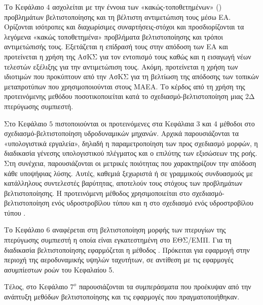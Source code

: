 Το Κεφάλαιο $4$ ασχολείται με την έννοια των «κακώς-τοποθετημένων» () προβλημάτων βελτιστοποίησης και τη βέλτιστη αντιμετώπιση τους μέσω ΕΑ.
\newline
Ορίζονται ισότροπες και διαχωρίσιμες συναρτήσεις-στόχοι και προσδιορίζονται τα λεγόμενα «κακώς τοποθετημένα» προβλήματα βελτιστοποίησης και τρόποι αντιμετώπισής τους.  Εξετάζεται η επίδρασή τους στην απόδοση των ΕΑ και προτείνεται η χρήση της ΑσΚΣ για τον εντοπισμό τους καθώς και η εισαγωγή νέων τελεστών εξέλιξης για την αντιμετώπιση τους.  Ακόμη, προτείνεται η χρήση των ιδιοτιμών που προκύπτουν από την ΑσΚΣ για τη βελτίωση της απόδοσης των τοπικών μεταπροτύπων που χρησιμοποιούνται στους ΜΑΕΑ. Το κέρδος από τη χρήση της προτεινόμενης μεθόδου ποσοτικοποιείται κατά το σχεδιασμό-βελτιστοποίηση μιας 2Δ πτερύγωσης συμπιεστή.  

Στο Κεφάλαιο $5$ πιστοποιούνται οι προτεινόμενες στα Κεφάλαια 3 και 4 μέθοδοι στο σχεδιασμό-βελτιστοποίηση υδροδυναμικών μηχανών.  Αρχικά παρουσιάζονται τα «υπολογιστικά εργαλεία»,  δηλαδή η παραμετροποίηση των προς σχεδιασμό μορφών, η διαδικασία γένεσης υπολογιστικού πλέγματος και ο επιλύτης των εξισώσεων της ροής.  Στη συνέχεια, παρουσιάζονται οι μετρικές ποιότητας που χαρακτηρίζουν την απόδοση κάθε υποψήφιας λύσης. Αυτές, καθεμιά ξεχωριστά ή σε γραμμικούς συνδυασμούς με κατάλληλους συντελεστές βαρύτητας, αποτελούν τους στόχους των προβλημάτων βελτιστοποίησης.    Η προτεινόμενη μέθοδος  χρησιμοποιείται στο σχεδιασμό-βελτιστοποίηση ενός υδροστροβίλου τύπου  και η  στο σχεδιασμό ενός υδροστροβίλου τύπου .   


Το Κεφάλαιο $6$ αναφέρεται στη βελτιστοποίηση μορφής των πτερυγίων της πτερύγωσης συμπιεστή η οποία είναι εγκατεστημένη στο ΕΘΣ/ΕΜΠ. Για τη διαδικασία βελτιστοποίησης εφαρμόζεται η μέθοδος . Πρόκειται για εφαρμογή στην περιοχή της αεροδυναμικής υψηλών ταχυτήτων, σε αντίθεση με τις εφαρμογές ασυμπίεστων ροών του Κεφαλαίου 5. 

Τέλος, στο Κεφάλαιο $7^o$ παρουσιάζονται τα συμπεράσματα που προέκυψαν από την ανάπτυξη μεθόδων βελτιστοποίησης και τις εφαρμογές που πραγματοποιήθηκαν.

